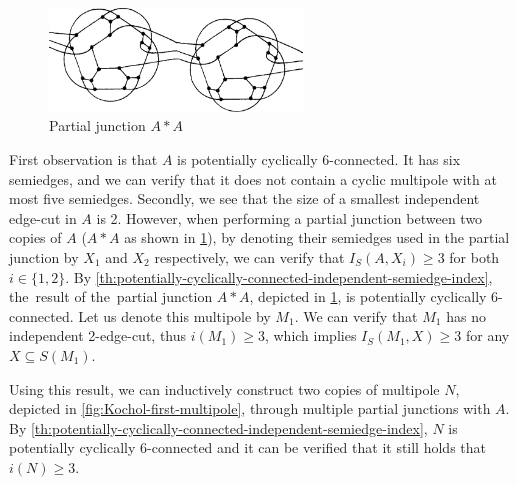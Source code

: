 \documentclass[12pt, twoside]{book}
\begin{document}
\begin{example}
	\begin{figure}
		\centering
		\includegraphics[width=0.6\textwidth]{images/Kochol-article/Kochol-multipoles-first-junction}
		\caption{Partial junction $A*A$}
		\label{fig:Kochol-first-partial-junction}
	\end{figure}
	
	First observation is that $A$ is potentially cyclically 6-connected. It has six semiedges, and we can verify that it does not contain a cyclic multipole with at most five semiedges. Secondly, we see that the size of a smallest independent edge-cut in $A$ is 2. However, when performing a partial junction between two copies of $A$ ($A*A$ as shown in \cref{fig:Kochol-first-partial-junction}), by denoting their semiedges used in the partial junction by $X_1$ and $X_2$ respectively, we can verify that $I_S(A,X_i)\geq 3$ for both $i\in\{1,2\}$. By \cref{th:potentially-cyclically-connected-independent-semiedge-index}, the~result of the~partial junction $A*A$, depicted in \cref{fig:Kochol-first-partial-junction}, is potentially cyclically 6-connected. Let us denote this multipole by $M_1$. We can verify that $M_1$ has no independent 2-edge-cut, thus $i(M_1)\geq 3$, which implies $I_S(M_1, X)\geq 3$ for any ${X\subseteq S(M_1)}$.
	
	Using this result, we can inductively construct two copies of multipole $N$, depicted in \cref{fig:Kochol-first-multipole}, through multiple partial junctions with $A$. By \cref{th:potentially-cyclically-connected-independent-semiedge-index}, $N$ is potentially cyclically 6-connected and it can be verified that it still holds that $i(N)\geq 3$.
	

\end{example}
\end{document}
